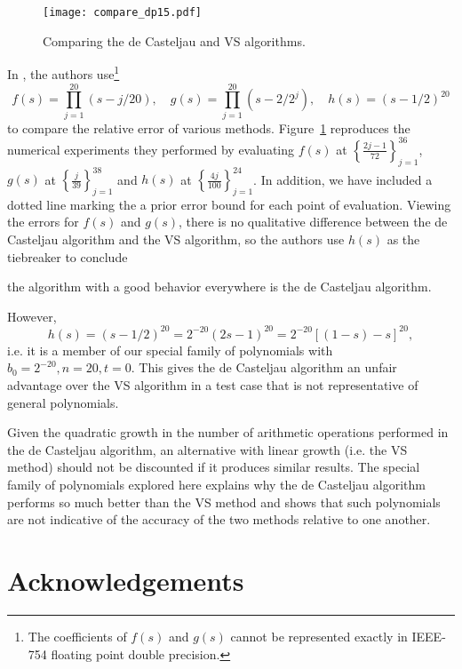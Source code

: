 \documentclass[letterpaper,10pt]{article}
\theoremstyle{definition}
\begin{document}
\begin{figure}
  \texttt{[image: compare\_dp15.pdf]}
  \centering
  \captionsetup{width=.75\linewidth}
  \caption{Comparing the de Casteljau and VS algorithms.}
  \label{fig:dp15-compare}
\end{figure}

In \cite{Delgado2015}, the authors use\footnote{The coefficients of \(f(s)\)
and \(g(s)\) cannot be represented exactly in IEEE-754 floating point
double precision.}
\begin{equation}
f(s) = \prod_{j = 1}^{20} (s - j/20), \quad
g(s) = \prod_{j = 1}^{20} (s - 2/2^j), \quad
h(s) = (s - 1/2)^{20}
\end{equation}
to compare the relative error of various methods.
Figure~\ref{fig:dp15-compare} reproduces the numerical experiments they
performed by evaluating \(f(s)\) at
\(\left\{\frac{2j - 1}{72}\right\}_{j = 1}^{36}\),
\(g(s)\) at \(\left\{\frac{j}{39}\right\}_{j = 1}^{38}\) and
\(h(s)\) at \(\left\{\frac{4j}{100}\right\}_{j = 1}^{24}\).
In addition, we have included a dotted line marking the
a prior error bound for each point of evaluation.
Viewing the errors for \(f(s)\) and \(g(s)\), there is no qualitative
difference between the de Casteljau algorithm and the VS algorithm, so
the authors use \(h(s)\) as the tiebreaker to conclude
\begin{displayquote}
the algorithm with a good behavior everywhere is the de Casteljau algorithm.
\end{displayquote}
However,
\begin{equation}
h(s) = \left(s - 1/2\right)^{20} = 2^{-20} (2s - 1)^{20}
  = 2^{-20} \left[(1 - s) - s\right]^{20},
\end{equation}
i.e. it is a member of our special family of polynomials with
\(b_0 = 2^{-20}, n = 20, t = 0\). This gives the de Casteljau
algorithm an unfair advantage over the VS algorithm in a
test case that is not representative of general polynomials.

Given the quadratic growth in the number of arithmetic operations
performed in the de Casteljau algorithm, an alternative with
linear growth (i.e. the VS method) should not be discounted if
it produces similar results. The special family of polynomials
explored here explains why the de Casteljau algorithm performs
so much better than the VS method and shows that such polynomials
are not indicative of the accuracy of the two methods
relative to one another.

\section{Acknowledgements}
\end{document}

